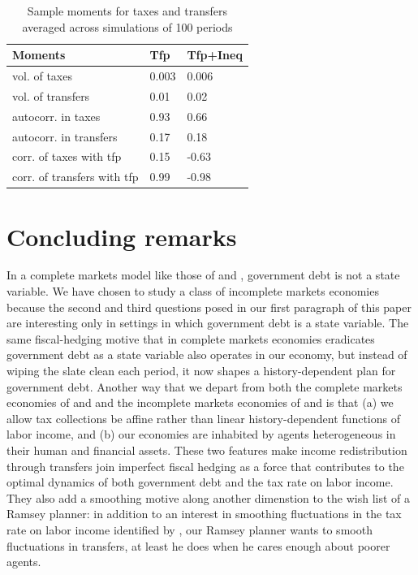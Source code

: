 \documentclass[thmsb,11pt]{article}
\begin{document}
\begin{table}[htp]

\begin{tabular}{|l|l|l|}
\hline
Moments &Tfp& Tfp+Ineq\\\hline
vol. of taxes & 0.003&0.006\\
vol. of transfers &0.01 &0.02\\
autocorr. in taxes& 0.93&0.66\\
autocorr. in transfers& 0.17&0.18\\
corr. of taxes with tfp &0.15 &-0.63\\
corr. of transfers with tfp & 0.99&-0.98\\ \hline
\end{tabular}
\caption{Sample moments for taxes and transfers averaged across simulations of 100 periods}
\label{tab:sample moments}
\end{table}




\section{Concluding remarks}\label{sec:concluding}
In a  complete markets model like those of  \citet{LucasJr.1983} and \citet{Chari1994}, government debt is not a state
variable.  We have chosen to  study a class of incomplete markets economies because 
the second and third questions posed in our first paragraph of this paper are interesting only in settings in which
 government debt is a state variable.  The same fiscal-hedging motive  that  in complete markets economies %
 eradicates
 government debt as a state variable also operates in our economy, but instead of wiping the slate clean each period,
 it now shapes a history-dependent plan for  government debt.  Another way that we depart from  both the complete
 markets economies of \citet{LucasJr.1983} and \citet{Chari1994} and the incomplete markets economies of \citet{Aiyagari2002}
 and \citet{Farhi2010} is that (a) we allow tax collections be affine rather than linear history-dependent functions of labor income, and
 (b) our economies are inhabited by agents heterogeneous in their human and financial assets. These two features make income redistribution through
 transfers join  imperfect fiscal hedging as a force that contributes to the optimal  dynamics of both government debt and the tax rate on labor income. 
 They also add a smoothing  motive along another dimenstion to the wish list of a Ramsey planner: in addition to an interest
 in  smoothing fluctuations in the tax rate on labor income identified by \citet{Barro1979}, our Ramsey planner wants to  smooth fluctuations in 
 transfers, at least he does  when he cares enough about poorer agents.  
 
\end{document}

